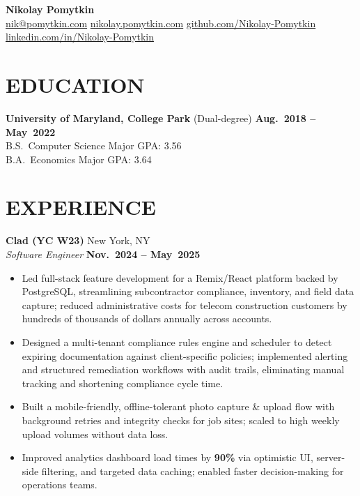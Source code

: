 \documentclass[10pt]{article}
\begin{document}
\begin{center}
  {\LARGE \textbf{Nikolay Pomytkin}}\\[-1pt]
  \href{mailto:nik@pomytkin.com}{nik@pomytkin.com} \textbar{}
  \href{http://nikolay.pomytkin.com}{nikolay.pomytkin.com} \textbar{}
  \href{http://github.com/Nikolay-Pomytkin}{github.com/Nikolay-Pomytkin} \textbar{}
  \href{http://linkedin.com/in/Nikolay-Pomytkin}{linkedin.com/in/Nikolay-Pomytkin}
\end{center}
\vspace{2pt}

\section*{EDUCATION}
\textbf{University of Maryland, College Park} (Dual-degree) \hfill \textbf{Aug.\ 2018 -- May\ 2022}\\
B.S.\ Computer Science \hfill Major GPA: 3.56\\
B.A.\ Economics \hfill Major GPA: 3.64

\section*{EXPERIENCE}

\textbf{Clad (YC W23)} \hfill New York, NY\\
\emph{Software Engineer} \hfill \textbf{Nov.\ 2024 -- May\ 2025}
\begin{itemize}
  \item Led full-stack feature development for a Remix/React platform backed by PostgreSQL, streamlining subcontractor compliance, inventory, and field data capture; reduced administrative costs for telecom construction customers by hundreds of thousands of dollars annually across accounts.
  \item Designed a multi-tenant compliance rules engine and scheduler to detect expiring documentation against client-specific policies; implemented alerting and structured remediation workflows with audit trails, eliminating manual tracking and shortening compliance cycle time.
  \item Built a mobile-friendly, offline-tolerant photo capture \& upload flow with background retries and integrity checks for job sites; scaled to high weekly upload volumes without data loss.
  \item Improved analytics dashboard load times by \textbf{90\%} via optimistic UI, server-side filtering, and targeted data caching; enabled faster decision-making for operations teams.
\end{itemize}
\end{document}
